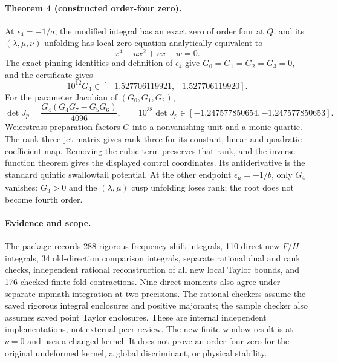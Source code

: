 \paragraph{Theorem 4 (constructed order-four zero).}
At $\epsilon_4=-1/a$, the modified integral has an exact zero
of order four at $Q$, and its $(\lambda,\mu,\nu)$ unfolding has
local zero equation analytically equivalent to
\[
 x^4+ux^2+vx+w=0.
\]
The exact pinning identities and definition of $\epsilon_4$ give
$G_0=G_1=G_2=G_3=0$, and the certificate gives
\[
 10^{12}G_4\in[-1.527706119921,-1.527706119920].
\]
For the parameter Jacobian of $(G_0,G_1,G_2)$,
\[
 \det J_p=\frac{G_4(G_4G_7-G_5G_6)}{4096},\qquad
 10^{38}\det J_p\in[-1.247577850654,-1.247577850653].
\]
Weierstrass preparation factors $G$ into a nonvanishing unit
and a monic quartic. The rank-three jet matrix gives rank three
for its constant, linear and quadratic coefficient map. Removing
the cubic term preserves that rank, and the inverse function
theorem gives the displayed control coordinates. Its antiderivative
is the standard quintic swallowtail potential. At the other
endpoint $\epsilon_\mu=-1/b$, only $G_4$ vanishes: $G_3>0$
and the $(\lambda,\mu)$ cusp unfolding loses rank; the root
does not become fourth order.

\paragraph{Evidence and scope.}
The package records 288 rigorous frequency-shift integrals,
110 direct new $F/H$ integrals, 34 old-direction comparison
integrals, separate rational dual and rank checks, independent
rational reconstruction of all new local Taylor bounds, and
176 checked finite fold contractions. Nine direct moments also
agree under separate mpmath integration at two precisions.
The rational checkers assume the saved rigorous integral
enclosures and positive majorants; the sample checker also
assumes saved point Taylor enclosures. These are internal
independent implementations, not external peer review.
The new finite-window result is at $\nu=0$ and uses a changed
kernel. It does not prove an order-four zero for the original
undeformed kernel, a global discriminant, or physical stability.

